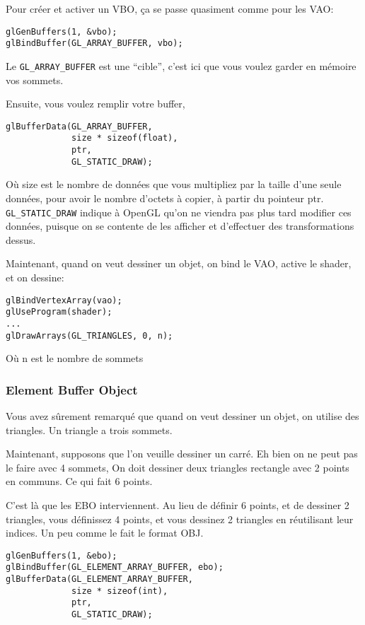 \documentclass[pdftex, 11pt, a4paper, titlepage]{article}
\begin{document}
Pour créer et activer un VBO, ça se passe quasiment comme pour les
VAO:

\begin{lstlisting}
glGenBuffers(1, &vbo);
glBindBuffer(GL_ARRAY_BUFFER, vbo);
\end{lstlisting}

Le \texttt{GL\_ARRAY\_BUFFER} est une ``cible'', c'est ici que vous
voulez garder en mémoire vos sommets.

Ensuite, vous voulez remplir votre buffer,

\begin{lstlisting}
glBufferData(GL_ARRAY_BUFFER,
             size * sizeof(float),
             ptr,
             GL_STATIC_DRAW);
\end{lstlisting}

Où size est le nombre de données que vous multipliez par la taille
d'une seule données, pour avoir le nombre d'octets à copier, à partir
du pointeur ptr.  \texttt{GL\_STATIC\_DRAW} indique à OpenGL qu'on ne
viendra pas plus tard modifier ces données, puisque on se contente de
les afficher et d'effectuer des transformations dessus.

Maintenant, quand on veut dessiner un objet, on bind le VAO, active le
shader, et on dessine:

\begin{lstlisting}
glBindVertexArray(vao);
glUseProgram(shader);
...
glDrawArrays(GL_TRIANGLES, 0, n);
\end{lstlisting}

Où n est le nombre de sommets

\pagebreak
\subsubsection{Element Buffer Object}

Vous avez sûrement remarqué que quand on veut dessiner un objet, on
utilise des triangles.  Un triangle a trois sommets.

Maintenant, supposons que l'on veuille dessiner un carré. Eh bien on
ne peut pas le faire avec 4 sommets, On doit dessiner deux triangles
rectangle avec 2 points en communs. Ce qui fait 6 points.

C'est là que les EBO interviennent. Au lieu de définir 6 points, et de
dessiner 2 triangles, vous définissez 4 points, et vous dessinez 2
triangles en réutilisant leur indices. Un peu comme le fait le format
OBJ.

\begin{lstlisting}
glGenBuffers(1, &ebo);
glBindBuffer(GL_ELEMENT_ARRAY_BUFFER, ebo);
glBufferData(GL_ELEMENT_ARRAY_BUFFER,
             size * sizeof(int),
             ptr,
             GL_STATIC_DRAW);
\end{lstlisting}
\end{document}
